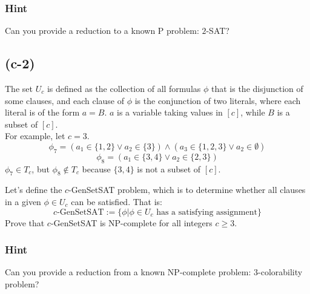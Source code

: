 \subsubsection*{Hint}

Can you provide a reduction to a known P problem: $2$-SAT?

\subsection*{(c-2)}

The set $U_c$ is defined as the collection of all formulas $\phi$ that is the disjunction of some clauses, and each clause of $\phi$ is the conjunction of two literals, where each literal is of the form $a=B$. $a$ is a variable taking values in $[c]$, while $B$ is a subset of $[c]$.\\
For example, let $c=3$.
$$\phi_7=(a_1\in\{1, 2\}\lor a_2\in\{3\})\land(a_3\in\{1, 2, 3\}\lor a_2\in\emptyset)$$
$$\phi_8=(a_1\in\{3, 4\}\lor a_2\in\{2, 3\})$$
$\phi_7\in T_c$, but $\phi_8\notin T_c$ because $\{3, 4\}$ is not a subset of $[c]$.

Let's define the $c$-GenSetSAT problem, which is to determine whether all clauses in a given $\phi\in U_c$ can be satisfied. That is:
$$c\text{-GenSetSAT}:=\{\phi|\phi\in U_c\text{ has a satisfying assignment}\}$$
Prove that $c$-GenSetSAT is NP-complete for all integers $c\geq3$.

\subsubsection*{Hint}

Can you provide a reduction from a known NP-complete problem: $3$-colorability problem?
